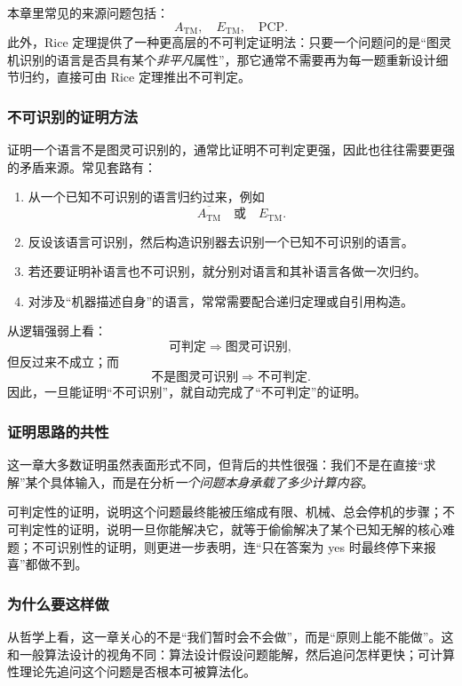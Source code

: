 本章里常见的来源问题包括：
\[
A_{\mathrm{TM}},\quad E_{\mathrm{TM}},\quad \mathrm{PCP}.
\]
此外，Rice 定理提供了一种更高层的不可判定证明法：只要一个问题问的是“图灵机识别的语言是否具有某个\emph{非平凡}属性”，那它通常不需要再为每一题重新设计细节归约，直接可由 Rice 定理推出不可判定。

\subsubsection*{不可识别的证明方法}

证明一个语言不是图灵可识别的，通常比证明不可判定更强，因此也往往需要更强的矛盾来源。常见套路有：

\begin{enumerate}[label=(\arabic*)]
  \item 从一个已知不可识别的语言归约过来，例如
  \[
  \overline{A_{\mathrm{TM}}}
  \quad\text{或}\quad
  E_{\mathrm{TM}}.
  \]
  \item 反设该语言可识别，然后构造识别器去识别一个已知不可识别的语言。
  \item 若还要证明补语言也不可识别，就分别对语言和其补语言各做一次归约。
  \item 对涉及“机器描述自身”的语言，常常需要配合递归定理或自引用构造。
\end{enumerate}

从逻辑强弱上看：
\[
\text{可判定}
\Longrightarrow
\text{图灵可识别},
\]
但反过来不成立；而
\[
\text{不是图灵可识别}
\Longrightarrow
\text{不可判定}.
\]
因此，一旦能证明“不可识别”，就自动完成了“不可判定”的证明。

\subsubsection*{证明思路的共性}

这一章大多数证明虽然表面形式不同，但背后的共性很强：我们不是在直接“求解”某个具体输入，而是在分析\emph{一个问题本身承载了多少计算内容}。

可判定性的证明，说明这个问题最终能被压缩成有限、机械、总会停机的步骤；不可判定性的证明，说明一旦你能解决它，就等于偷偷解决了某个已知无解的核心难题；不可识别性的证明，则更进一步表明，连“只在答案为 yes 时最终停下来报喜”都做不到。

\subsubsection*{为什么要这样做}

从哲学上看，这一章关心的不是“我们暂时会不会做”，而是“原则上能不能做”。这和一般算法设计的视角不同：算法设计假设问题能解，然后追问怎样更快；可计算性理论先追问这个问题是否根本可被算法化。

